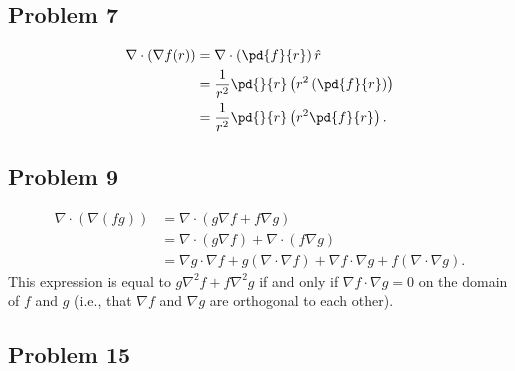 \documentclass[10pt]{mypackage}
\begin{document}
\subsection{Problem 7}%
\begin{align*}
  \nabla \cdot \left(\nabla f(r)\right) &= \nabla \cdot \left(\pd{f}{r}\right)\hat{r}\\
                                        &= \frac{1}{r^2}\pd{}{r}\left(r^2\left(\pd{f}{r}\right)\right)\\
                                        &= \frac{1}{r^2}\pd{}{r}\left(r^2\pd{f}{r}\right).
\end{align*}
\subsection{Problem 9}%
\begin{align*}
  \nabla\cdot \left(\nabla\left(fg\right)\right) &= \nabla \cdot \left(g\nabla f + f\nabla g\right)\\
                                                 &= \nabla \cdot \left(g\nabla f\right) + \nabla \cdot \left(f\nabla g\right)\\
                                                 &= \nabla g\cdot\nabla f + g\left(\nabla \cdot \nabla f\right) + \nabla f \cdot \nabla g + f\left(\nabla \cdot \nabla g\right).
\end{align*}
This expression is equal to $g\nabla^2 f + f\nabla^2 g$ if and only if $\nabla f \cdot \nabla g = 0$ on the domain of $f$ and $g$ (i.e., that $\nabla f$ and $\nabla g$ are orthogonal to each other).
\subsection{Problem 15}%
\end{document}
